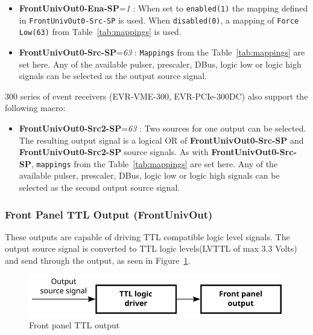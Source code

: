 \documentclass[12pt,a4paper]{article}
\begin{document}
  \begin{itemize}
  \item
   \textbf{FrontUnivOut0-Ena-SP}=\emph{1} : When set to \texttt{enabled(1)} the mapping
    defined in \texttt{FrontUnivOut0-Src-SP} is used. When \texttt{disabled(0)}, a
    mapping of \texttt{Force Low(63)} from Table~\ref{tab:mappings} is used.
  \item
    \textbf{FrontUnivOut0-Src-SP}=\emph{63} : \texttt{Mappings} from the Table~\ref{tab:mappings} are
    set here. Any of the available pulser, prescaler, DBus, logic low or
    logic high signals can be selected as the output source signal.
  \end{itemize}
300 series of event receivers (EVR-VME-300, EVR-PCIe-300DC) also support the following macro:
\begin{itemize}
  \item
    \textbf{FrontUnivOut0-Src2-SP}=\emph{63} : Two sources for one output can be selected. The resulting output signal is a logical OR of \textbf{FrontUnivOut0-Src-SP} and \textbf{FrontUnivOut0-Src2-SP} source signals. As with \newline\textbf{FrontUnivOut0-Src-SP}, \texttt{mappings} from the Table~\ref{tab:mappings} are set here. Any of the available pulser, prescaler, DBus, logic low or logic high signals can be selected as the second output source signal.
  \end{itemize}
  
\subsubsection{Front Panel TTL Output (FrontUnivOut)}\label{sec:Front Panel TTL Output}
These outputs are capable of driving TTL compatible logic level signals. The output source signal is converted to TTL logic levels(LVTTL of max 3.3 Volts) and send through the output, as seen in Figure~\ref{fig:output_ttl}.

\begin{figure}[H]
	\centering
	\includegraphics[]{./img/TTL}
	\caption{Front panel TTL output}
	\label{fig:output_ttl}
\end{figure}
\end{document}
